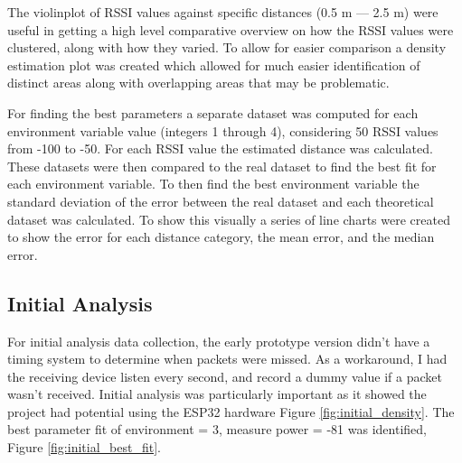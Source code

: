\documentclass{l4proj}
\begin{document}
The violinplot of RSSI values against specific distances (0.5 m — 2.5 m) were useful in getting a high level comparative overview on how the RSSI values were clustered, along with how they varied. To allow for easier comparison a density estimation plot was created which allowed for much easier identification of distinct areas along with overlapping areas that may be problematic.

For finding the best parameters a separate dataset was computed for each environment variable value (integers 1 through 4), considering 50 RSSI values from -100 to -50. For each RSSI value the estimated distance was calculated. These datasets were then compared to the real dataset to find the best fit for each environment variable. To then find the best environment variable the standard deviation of the error between the real dataset and each theoretical dataset was calculated. To show this visually a series of line charts were created to show the error for each distance category, the mean error, and the median error.

\subsection{Initial Analysis}

For initial analysis data collection, the early prototype version didn't have a timing system to determine when packets were missed. As a workaround, I had the receiving device listen every second, and record a dummy value if a packet wasn't received. Initial analysis was particularly important as it showed the project had potential using the ESP32 hardware Figure \ref{fig:initial_density}. The best parameter fit of environment = 3, measure power = -81 was identified, Figure \ref{fig:initial_best_fit}.
\end{document}
